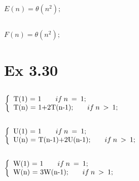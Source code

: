    \subsection{}
 $E(n) = \theta{(n^2)};$
 
    \subsection{}
 $F(n) = \theta{(n^2)};$
 
 
 
 
 \section{Ex 3.30}
     \subsection{}
     \begin{math}
  \left\{
    \begin{array}{l}
      $T(1) = 1$             \qquad             if \: n \:  = \: 1;\\
       $T(n) = 1+2T(n-1);$     \qquad      if  \: n  \: > \: 1;\\
    \end{array}
  \right.
\end{math}

 \subsection{}
 
      \begin{math}
  \left\{
    \begin{array}{l}
      $U(1) = 1$             \qquad             if \: n \:  = \: 1;\\
       $U(n) = T(n-1)+2U(n-1);$     \qquad      if  \: n  \: > \: 1;\\
    \end{array}
  \right.
\end{math}


 \subsection{}
 
 \begin{math}
  \left\{
    \begin{array}{l}
      $W(1) = 1$             \qquad             if \: n \:  = \: 1;\\
       $W(n) = 3W(n-1);$     \qquad      if  \: n  \: > \: 1;\\
    \end{array}
  \right.
\end{math}

